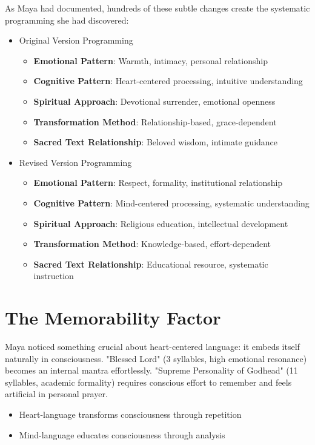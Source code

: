 \documentclass[11pt,twoside]{book}
\begin{document}
As Maya had documented, hundreds of these subtle changes create the systematic programming she had discovered:
\begin{itemize}
\item Original Version Programming
\label{sec:org19a5baa}
\begin{itemize}
\item \textbf{\textbf{Emotional Pattern}}: Warmth, intimacy, personal relationship
\item \textbf{\textbf{Cognitive Pattern}}: Heart-centered processing, intuitive understanding
\item \textbf{\textbf{Spiritual Approach}}: Devotional surrender, emotional openness
\item \textbf{\textbf{Transformation Method}}: Relationship-based, grace-dependent
\item \textbf{\textbf{Sacred Text Relationship}}: Beloved wisdom, intimate guidance
\end{itemize}
\item Revised Version Programming
\label{sec:org0e63104}
\begin{itemize}
\item \textbf{\textbf{Emotional Pattern}}: Respect, formality, institutional relationship
\item \textbf{\textbf{Cognitive Pattern}}: Mind-centered processing, systematic understanding
\item \textbf{\textbf{Spiritual Approach}}: Religious education, intellectual development
\item \textbf{\textbf{Transformation Method}}: Knowledge-based, effort-dependent
\item \textbf{\textbf{Sacred Text Relationship}}: Educational resource, systematic instruction
\end{itemize}
\end{itemize}
\section*{The Memorability Factor}
\label{sec:org5bcf9a6}

Maya noticed something crucial about heart-centered language: it embeds itself naturally in consciousness. "Blessed Lord" (3 syllables, high emotional resonance) becomes an internal mantra effortlessly. "Supreme Personality of Godhead" (11 syllables, academic formality) requires conscious effort to remember and feels artificial in personal prayer.
\begin{itemize}
\item Heart-language transforms consciousness through repetition
\item Mind-language educates consciousness through analysis
\end{itemize}
\end{document}
